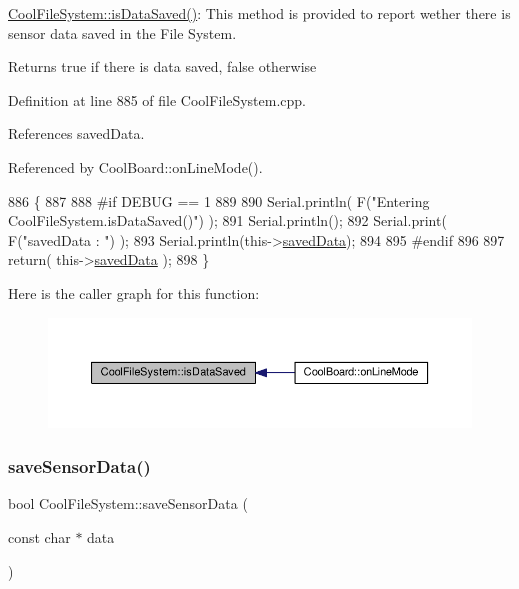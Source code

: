 \hyperlink{classCoolFileSystem_a5a7eaeea7a9fbf8aaef651d862fa3b5b}{Cool\+File\+System\+::is\+Data\+Saved()}\+: This method is provided to report wether there is sensor data saved in the File System.

\begin{DoxyReturn}{Returns}
true if there is data saved, false otherwise 
\end{DoxyReturn}


Definition at line 885 of file Cool\+File\+System.\+cpp.



References saved\+Data.



Referenced by Cool\+Board\+::on\+Line\+Mode().


\begin{DoxyCode}
886 \{
887 
888 \textcolor{preprocessor}{#if DEBUG == 1 }
889 
890     Serial.println( F(\textcolor{stringliteral}{"Entering CoolFileSystem.isDataSaved()"}) );
891     Serial.println();
892     Serial.print( F(\textcolor{stringliteral}{"savedData : "}) );
893     Serial.println(this->\hyperlink{classCoolFileSystem_ad398e0c5c41a0c88acdf5d672aa71351}{savedData});
894 
895 \textcolor{preprocessor}{#endif}
896 
897     \textcolor{keywordflow}{return}( this->\hyperlink{classCoolFileSystem_ad398e0c5c41a0c88acdf5d672aa71351}{savedData} );
898 \}
\end{DoxyCode}
Here is the caller graph for this function\+:
\nopagebreak
\begin{figure}[H]
\begin{center}
\leavevmode
\includegraphics[width=350pt]{classCoolFileSystem_a5a7eaeea7a9fbf8aaef651d862fa3b5b_icgraph}
\end{center}
\end{figure}
\mbox{\label{classCoolFileSystem_afa3a4feae94871d4d3b6bebb701c2e67}} 
\subsubsection{\texorpdfstring{save\+Sensor\+Data()}{saveSensorData()}}
{\footnotesize\ttfamily bool Cool\+File\+System\+::save\+Sensor\+Data (\begin{DoxyParamCaption}\item[{const char $\ast$}]{data }\end{DoxyParamCaption})}

